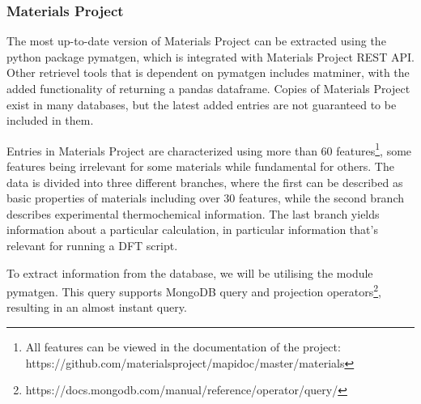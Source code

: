 

\subsubsection{Materials Project}
\label{ssec:materialsproject}

The most up-to-date version of Materials Project can be extracted using the python package pymatgen, which is integrated with Materials Project REST API. Other retrievel tools that is dependent on pymatgen includes matminer, with the added functionality of returning a pandas dataframe. Copies of Materials Project exist in many databases, but the latest added entries are not guaranteed to be included in them. %

Entries in Materials Project are characterized using more than 60 features\footnote{All features can be viewed in the documentation of the project: https://github.com/materialsproject/mapidoc/master/materials}, some features being irrelevant for some materials while fundamental for others. The data is divided into three different branches, where the first can be described as basic properties of materials including over $30$ features, while the second branch describes experimental thermochemical information. The last branch yields information about a particular calculation, in particular information that's relevant for running a DFT script.

To extract information from the database, we will be utilising the module pymatgen. This query supports MongoDB query and projection operators\footnote{https://docs.mongodb.com/manual/reference/operator/query/}, resulting in an almost instant query.

